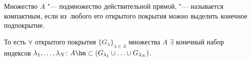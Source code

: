 
    Множество $A$ "--- подмножество действительной прямой, "--- называется компактным, если из~любого его открытого покрытия можно выделить конечное подпокрытие.

    То есть $\forall$ открытого покрытия $\Big\{G_\lambda\Big\}_{\lambda\in\Lambda}$ множества $A$ $\exists$ конечный набор индексов
    $\lambda_1,\ldots,\lambda_N\colon A\hm\subset(G_{\lambda_1}\cup\ldots\cup G_{\lambda_N})$.
